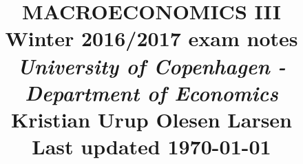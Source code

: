 \documentclass[12pt, a4paper]{article}
\begin{document}
\begin{spacing}{1.213}

\title{ MACROECONOMICS \textbf{III} \\ \Large Winter 2016/2017 exam notes \\ \large \textit{University of Copenhagen - Department of Economics}  \\ 
\normalsize Kristian Urup Olesen Larsen \\
\normalsize Last updated \today  } %
\date{} %
\maketitle %
\setcounter{page}{1} %


\pagebreak

\tableofcontents
\newpage


\end{spacing}
\end{document}
